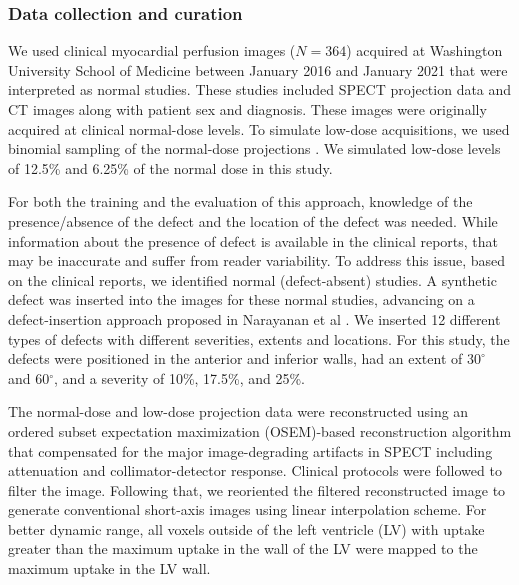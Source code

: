 \documentclass[]{spie}  %
\begin{document}
\subsubsection{Data collection and curation}
We used clinical myocardial perfusion images ($N = 364$) acquired at Washington University School of Medicine between January 2016 and January 2021 that were interpreted as normal studies. These studies included SPECT projection data and CT images along with patient sex and diagnosis.
These images were originally acquired at clinical normal-dose levels. To simulate low-dose acquisitions, we used binomial sampling of the normal-dose projections \cite{juan2018investigation}. We simulated low-dose levels of 12.5\% and 6.25\% of the normal dose in this study.

For both the training and the evaluation of this approach, knowledge of the presence/absence of the defect and the location of the defect was needed. While information about the presence of defect is available in the clinical reports, that may be inaccurate and suffer from reader variability. To address this issue, based on the clinical reports, we identified normal (defect-absent) studies. A synthetic defect was inserted into the images for these normal studies, advancing on a defect-insertion approach proposed in Narayanan et al \cite{narayanan2001optimization}. We inserted 12 different types of defects with different severities, extents and locations. For this study, the defects were positioned in the anterior and inferior walls, had an extent of $30^{\circ}$ and 60$^{\circ}$, and a severity of 10\%, 17.5\%, and 25\%.  

The normal-dose and low-dose projection data were reconstructed using an ordered subset expectation maximization (OSEM)-based reconstruction algorithm that compensated for the major image-degrading artifacts in SPECT including attenuation and collimator-detector response. Clinical protocols were followed to filter the image. Following that, we reoriented the filtered reconstructed image to generate conventional short-axis images using linear interpolation scheme. For better dynamic range, all voxels outside of the left ventricle (LV) with uptake greater than the maximum uptake in the wall of the LV were mapped to the maximum uptake in the LV wall.
\end{document}
